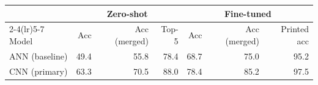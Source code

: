 \begin{tabular}{lrrrrrr}
\toprule
& \multicolumn{3}{c}{Zero-shot} & \multicolumn{3}{c}{Fine-tuned} \\
\cmidrule(lr){2-4}\cmidrule(lr){5-7}
Model & Acc & Acc (merged) & Top-5 & Acc & Acc (merged) & Printed acc \\
\midrule
ANN (baseline) & 49.4 & 55.8 & 78.4 & 68.7 & 75.0 & 95.2 \\
CNN (primary) & 63.3 & 70.5 & 88.0 & 78.4 & 85.2 & 97.5 \\
\bottomrule
\end{tabular}
